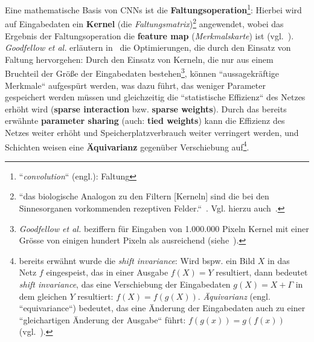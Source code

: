 Eine mathematische Basis von CNNs ist die \textbf{Faltungsoperation}\footnote{
    ``\textit{convolution}`` (engl.): Faltung
}: Hierbei wird auf Eingabedaten ein \textbf{Kernel} (die \textit{Faltungsmatrix})\footnote{
    ``das biologische Analogon zu den Filtern [Kerneln] sind die bei den Sinnesorganen vorkommenden rezeptiven Felder.``~\cite[326]{Ert21b}. Vgl. hierzu auch~\cite[439]{LBH15}.
} angewendet, wobei das Ergebnis der Faltungsoperation die \textbf{feature map} (\textit{Merkmalskarte}) ist (vgl.~\cite[370]{GBC18}). \textit{Goodfellow et al.} erläutern in~\cite[374 ff.]{GBC18} die Optimierungen, die durch den Einsatz von Faltung hervorgehen: Durch den Einsatz von Kerneln, die nur aus einem Bruchteil der Größe der Eingabedaten bestehen\footnote{\textit{Goodfellow et al.} beziffern für Eingaben von 1.000.000 Pixeln Kernel mit einer Grösse von einigen hundert Pixeln als ausreichend (siehe~\cite[374]{GBC18}).
}, können ``aussagekräftige Merkmale`` aufgespürt werden, was dazu führt, das weniger Parameter gespeichert werden müssen und gleichzeitig die ``statistische Effizienz`` des Netzes erhöht wird (\textbf{sparse interaction} bzw. \textbf{sparse weights}). Durch das bereits erwähnte \textbf{parameter sharing} (auch: \textbf{tied weights}) kann die Effizienz des Netzes weiter erhöht und Speicherplatzverbrauch weiter verringert werden, und Schichten weisen eine \textbf{Äquivarianz} gegenüber Verschiebung auf\footnote{ bereits erwähnt wurde die \textit{shift invariance}: Wird bspw. ein Bild $X$ in das Netz $f$ eingespeist, das in einer Ausgabe $f(X) = Y$ resultiert, dann bedeutet \textit{shift invariance}, das eine Verschiebung der Eingabedaten $g(X) = X+\Gamma$ in dem gleichen $Y$ resultiert: $f(X) = f(g(X))$.  \textit{Äquivarianz} (engl. ``equivariance``) bedeutet, das eine Änderung der Eingabedaten auch zu einer ``gleichartigen Änderung der Ausgabe`` führt: $f(g(x)) = g(f(x))$ (vgl.~\cite[377]{GBC18}).
}.



